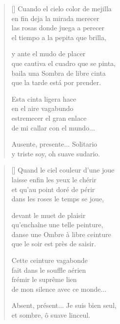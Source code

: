 



\settowidth{\versewidth}{Que cautiva el cuadro que se pinta,}

\bigskip

\begin{verse}[\versewidth]
  Cuando el cielo color de mejilla \\
  en fin deja la mirada merecer \\
  las rosas donde juega a perecer \\
  el tiempo a la pepita que brilla,

  y ante el mudo de placer \\
  que cautiva el cuadro que se pinta, \\
  baila una Sombra de libre cinta \\
  que la tarde está por prender.

  Esta cinta ligera hace \\
  en el aire vagabundo \\
  estremecer el gran enlace \\
  de mi callar con el mundo...

  Ausente, presente... Solitario \\
  y triste soy, oh suave sudario.
\end{verse}

\newpage



\settowidth{\versewidth}{Absent, présent... Je suis bien seul,}

\bigskip

{\itshape
\begin{verse}[\versewidth]
  Quand le ciel couleur d'une joue \\
  laisse enfin les yeux le chérir \\
  et qu'au point doré de périr \\
  dans les roses le temps se joue,


  devant le muet de plaisir \\
  qu'enchaîne une telle peinture, \\
  danse une Ombre à libre ceinture \\
  que le soir est près de saisir.

  Cette ceinture vagabonde \\
  fait dans le souffle aérien \\
  frémir le suprême lien \\
  de mon silence avec ce monde...

  Absent, présent... Je suis bien seul, \\
  et sombre, ô suave linceul.
\end{verse}
}
